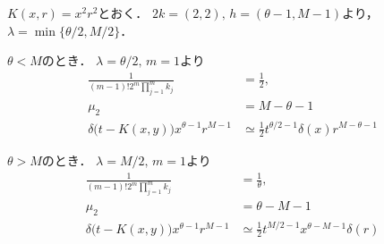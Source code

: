 \documentclass[11pt,a4paper]{jsarticle}
\begin{document}
$K(x, r) = x^2 r^2$とおく．
$2k = (2, 2), \, h = (\theta - 1, M - 1)$より，$\lambda = \min \bigl\{ \theta/2, M/2 \bigr\}$．

$\theta < M$のとき．
$\lambda = \theta/2, \, m = 1$より
\begin{align}
\frac{1}{(m - 1)! 2^m \prod_{j=1}^m k_j}
& =
\frac{1}{2}, \nonumber \\
\mu_2
& =
M - \theta - 1 \nonumber \\
\delta \bigl( t - K(x, y) \bigr) x^{\theta - 1} r^{M - 1}
& \simeq
\frac{1}{2} t^{\theta/2 - 1} \delta(x) r^{M - \theta - 1} \nonumber
\end{align}

$\theta > M$のとき．
$\lambda = M/2, \, m = 1$より
\begin{align}
\frac{1}{(m - 1)! 2^m \prod_{j=1}^m k_j}
& =
\frac{1}{\theta}, \nonumber \\
\mu_2
& =
\theta - M - 1 \nonumber \\
\delta \bigl( t - K(x, y) \bigr) x^{\theta - 1} r^{M - 1}
& \simeq
\frac{1}{2} t^{M/2 - 1} x^{\theta - M - 1} \delta(r) \nonumber
\end{align}
\end{document}
